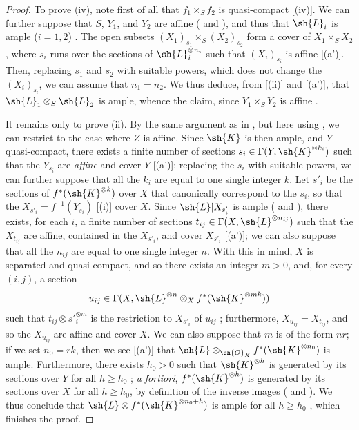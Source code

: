 \begin{proof}
To prove (iv), note first of all that $f_1\times_S f_2$ is quasi-compact [(iv)].
We can further suppose that $S$, $Y_1$, and $Y_2$ are affine ( and ), and thus that $\sh{L}_i$ is ample ($i=1,2$) .
The open subsets $(X_1)_{s_1}\times_S(X_2)_{s_2}$ form a cover of $X_1\times_S X_2$, where $s_i$ runs over the sections of $\sh{L}_i^{\otimes n_i}$ such that $(X_i)_{s_i}$ is affine [(a')].
Then, replacing $s_1$ and $s_2$ with suitable powers, which does not change the $(X_i)_{s_i}$, we can assume that $n_1=n_2$.
We thus deduce, from [(ii)] and [(a')], that $\sh{L}_1\otimes_S\sh{L}_2$ is ample, whence the claim, since $Y_1\times_S Y_2$ is affine .

It remains only to prove (ii).
By the same argument as in , but here using , we can restrict to the case where $Z$ is affine.
Since $\sh{K}$ is then ample, and $Y$ quasi-compact, there exists a finite number of sections $s_i\in\Gamma(Y,\sh{K}^{\otimes k_i})$ such that the $Y_{s_i}$
are \emph{affine} and cover $Y$ [(a')];
replacing the $s_i$ with suitable powers, we can further suppose that all the $k_i$ are equal to one single integer $k$.
Let $s'_i$ be the sections of $f^*(\sh{K}^{\otimes k})$ over $X$ that canonically correspond to the $s_i$, so that the $X_{s'_i}=f^{-1}(Y_{s_i})$ [(i)] cover $X$.
Since $\sh{L}|X_{s'_i}$ is ample ( and ), there exists, for each $i$, a finite number of sections $t_{ij}\in\Gamma(X,\sh{L}^{\otimes n_{ij}})$ such that the $X_{t_{ij}}$ are affine, contained in the $X_{s'_i}$, and cover $X_{s'_i}$ [(a')];
we can also suppose that all the $n_{ij}$ are equal to one single integer $n$.
With this in mind, $X$ is separated and quasi-compact, and so there exists an integer $m>0$, and, for every $(i,j)$, a section
\[
  u_{ij}\in\Gamma(X,\sh{L}^{\otimes n}\otimes_X f^*(\sh{K}^{\otimes mk}))
\]
such that $t_{ij}\otimes s'^{\otimes m}_i$ is the restriction to $X_{s'_i}$ of $u_{ij}$ ;
furthermore, $X_{u_{ij}}=X_{t_{ij}}$, and so the $X_{u_{ij}}$ are affine and cover $X$.
We can also suppose that $m$ is of the form $nr$;
if we set $n_0=rk$, then we see [(a')] that $\sh{L}\otimes_{\sh{O}_X}f^*(\sh{K}^{\otimes n_0})$ is ample.
Furthermore, there exists $h_0>0$ such that $\sh{K}^{\otimes h}$ is generated by its sections over $Y$ for all $h\geq h_0$ ;
\emph{a fortiori}, $f^*(\sh{K}^{\otimes h})$ is generated by its sections over $X$ for all $h\geq h_0$, by definition of the inverse images ( and ).
We thus conclude that $\sh{L}\otimes f^*(\sh{K}^{\otimes n_0+h})$ is ample for all $h\geq h_0$ , which finishes the proof.
\end{proof}

